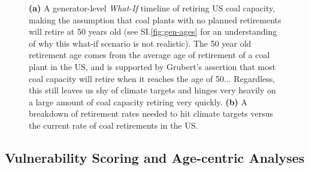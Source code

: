 \begin{figure}[htb]
    \textbf{(a)} A generator-level \textit{What-If} timeline of retiring US coal capacity, making the assumption that coal plants with no planned retirements will retire at 50 years old (see SI.\ref{fig:gen-ages} for an understanding of why this what-if scenario is not realistic).
    The 50 year old retirement age comes from the average age of retirement of a coal plant in the US, and is supported by Grubert's assertion that most coal capacity will retire when it reaches the age of 50...
    Regardless, this still leaves us shy of climate targets and hinges very heavily on a large amount of coal capacity retiring very quickly.
    \textbf{(b)} A breakdown of retirement rates needed to hit climate targets versus the current rate of coal retirements in the US.

    \label{fig:ret_timeline}
\end{figure}



\subsection{Vulnerability Scoring and Age-centric Analyses}

